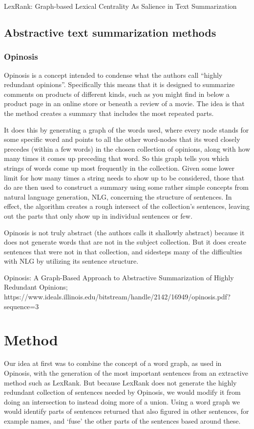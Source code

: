 \documentclass[10pt, a4paper]{article}
\begin{document}
LexRank: Graph-based Lexical Centrality As Salience in Text Summarization

\subsection{Abstractive text summarization methods}

\subsubsection{Opinosis}
Opinosis is a concept intended to condense what the authors call “highly redundant opinions”. Specifically this means that it is designed to summarize comments on products of different kinds, such as you might find in below a product page in an online store or beneath a review of a movie. The idea is that the method creates a summary that includes the most repeated parts.

It does this by generating a graph of the words used, where every node stands for some specific word and points to all the other word-nodes that its word closely precedes (within a few words) in the chosen collection of opinions, along with how many times it comes up preceding that word. So this graph tells you which strings of words come up most frequently in the collection. Given some lower limit for how many times a string needs to show up to be considered, those that do are then used to construct a summary using some rather simple concepts from natural language generation, NLG, concerning the structure of sentences. In effect, the algorithm creates a rough intersect of the collection’s sentences, leaving out the parts that only show up in individual sentences or few.

Opinosis is not truly abstract (the authors calls it shallowly abstract) because it does not generate words that are not in the subject collection. But it does create sentences that were not in that collection, and sidesteps many of the difficulties with NLG by utilizing its sentence structure.

Opinosis: A Graph-Based Approach to Abstractive Summarization of Highly Redundant Opinions;
https://www.ideals.illinois.edu/bitstream/handle/2142/16949/opinosis.pdf?sequence=3

\section{Method}

Our idea at first was to combine the concept of a word graph, as used in Opinosis, with the generation of the most important sentences from an extractive method such as LexRank. But because LexRank does not generate the highly redundant collection of sentences needed by Opinosis, we would modify it from doing an intersection to instead doing more of a union. Using a word graph we would identify parts of sentences returned that also figured in other sentences, for example names, and ‘fuse’ the other parts of the sentences based around these.
\end{document}
